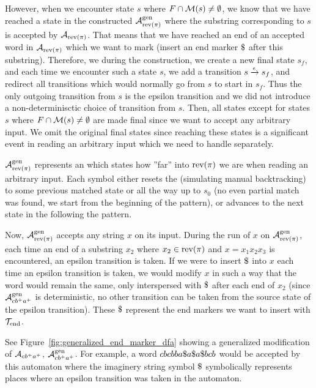 However, when we encounter state $s$ where $F \cap \mathcal{M}(s) \neq \emptyset$, we know that we have reached a state in the constructed $\mathcal{A}^{\text{gen}}_{\text{rev(}\pi\text{)}}$ where the substring corresponding to $s$ is accepted by $\mathcal{A}_{\text{rev(}\pi\text{)}}$.
That means that we have reached an end of an accepted word in $\mathcal{A}_{\text{rev(}\pi\text{)}}$ which we want to mark (insert an end marker $\marker$ after this substring).
Therefore, we during the construction, we create a new final state $s_f$, and each time we encounter such a state $s$, we add a transition ${s} \xrightarrow{{\epsilon}} {s_f}$, and redirect all transitions which would normally go from $s$ to start in $s_f$.
Thus the only outgoing transition from $s$ is the epsilon transition and we did not introduce a non-determinisctic choice of transition from $s$.
Then, all states except for states $s$ where $F \cap \mathcal{M}(s) \neq \emptyset$ are made final since we want to accept any arbitrary input.
We omit the original final states since reaching these states is a significant event in reading an arbitrary input which we need to handle separately.

$\mathcal{A}^{\text{gen}}_{\text{rev(}\pi\text{)}}$ represents an \dfa which states how ''far'' into $\text{rev(}\pi\text{)}$ we are when reading an arbitrary input.
Each symbol either resets the \dfa (simulating manual backtracking) to some previous matched state or all the way up to $s_0$ (no even partial match was found, we start from the beginning of the pattern), or advances to the next state in the \dfa following the pattern.

Now, $\mathcal{A}^{\text{gen}}_{\text{rev(}\pi\text{)}}$ accepts any string $x$ on its input.
During the run of $x$ on $\mathcal{A}^{\text{gen}}_{\text{rev(}\pi\text{)}}$, each time an end of a substring $x_2$ where $x_2 \in \text{rev(}\pi\text{)}$ and $x = x_1 x_2 x_3$ is encountered, an epsilon transition is taken.
If we were to insert $\marker$ into $x$ each time an epsilon transition is taken, we would modify $x$ in such a way that the word would remain the same, only interspersed with $\marker$ after each end of $x_2$ (since $\mathcal{A}^{\text{gen}}_{cb^+a^+}$ is deterministic, no other transition can be taken from the source state of the epsilon transition).
These $\marker$ represent the end markers we want to insert with $\mathcal{T}_{\text{end}}$.

See Figure~\ref{fig:generalized_end_marker_dfa} showing a generalized modification of \dfa $\mathcal{A}_{cb^+a^+}$, $\mathcal{A}^{\text{gen}}_{cb^+a^+}$.
For example, a word $cbcbba\$ a\$ a\$ bcb$ would be accepted by this automaton where the imaginery string symbol $\marker$ symbolically represents places where an epsilon transition was taken in the automaton.

